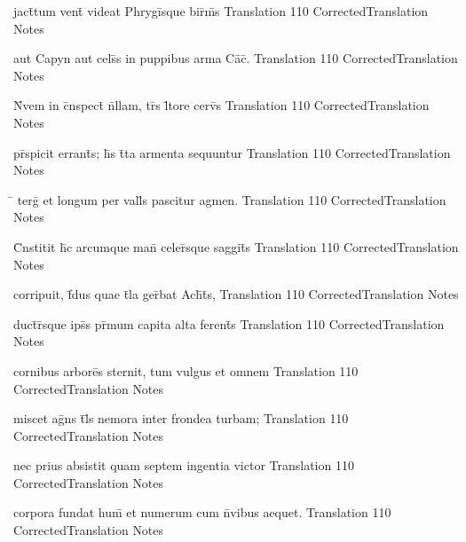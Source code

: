 \documentclass[]{book}
\begin{document}
\latline
  {jact\={}tum vent\={} videat Phrygi\={}sque bir\={}m\={\macron {\i}}s}
  { Translation }
  {110}
  { CorrectedTranslation }
  { Notes }


\latline
  {aut Capyn aut cels\={\macron {\i}}s in puppibus arma Ca\={\macron {\i}}c\={\macron {\i}}.}
  { Translation }
  {110}
  { CorrectedTranslation }
  { Notes }



\latline
  {N\={}vem in c\={}nspect\={} n\={}llam, tr\={\macron {\i}}s l\={\macron {\i}}tore cerv\={}s}
  { Translation }
  {110}
  { CorrectedTranslation }
  { Notes }


\latline
  {pr\={}spicit errant\={\macron {\i}}s; h\={}s t\={}ta armenta sequuntur}
  { Translation }
  {110}
  { CorrectedTranslation }
  { Notes }


\latline
  {\={} terg\={} et longum per vall\={\macron {\i}}s pascitur agmen.}
  { Translation }
  {110}
  { CorrectedTranslation }
  { Notes }



\latline
  {C\={}nstitit h\={\macron {\i}}c arcumque man\={} celer\={\macron {\i}}sque saggit\={}s}
  { Translation }
  {110}
  { CorrectedTranslation }
  { Notes }


\latline
  {corripuit, f\={\macron {\i}}dus quae t\={}la ger\={}bat Ach\={}t\={}s,}
  { Translation }
  {110}
  { CorrectedTranslation }
  { Notes }


\latline
  {duct\={}r\={}sque ips\={}s pr\={\macron {\i}}mum capita alta ferent\={\macron {\i}}s}
  { Translation }
  {110}
  { CorrectedTranslation }
  { Notes }



\latline
  {cornibus arbore\={\macron {\i}}s sternit, tum vulgus et omnem}
  { Translation }
  {110}
  { CorrectedTranslation }
  { Notes }


\latline
  {miscet ag\={}ns t\={}l\={\macron {\i}}s nemora inter frondea turbam;}
  { Translation }
  {110}
  { CorrectedTranslation }
  { Notes }


\latline
  {nec prius absistit quam septem ingentia victor }
  { Translation }
  {110}
  { CorrectedTranslation }
  { Notes }



\latline
  {corpora fundat hum\={\macron {\i}} et numerum cum n\={}vibus aequet.}
  { Translation }
  {110}
  { CorrectedTranslation }
  { Notes }
\end{document}
